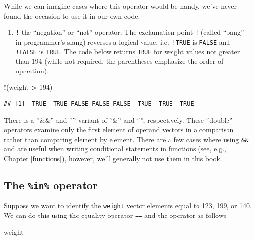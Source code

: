 \documentclass[
]{krantz}
\newenvironment{Shaded}{\begin{snugshade}}{\end{snugshade}}
\newcommand{\DecValTok}[1]{\textcolor[rgb]{0.00,0.00,0.81}{#1}}
\newcommand{\NormalTok}[1]{#1}
\newcommand{\OperatorTok}[1]{\textcolor[rgb]{0.81,0.36,0.00}{\textbf{#1}}}
\newcommand{\StringTok}[1]{\textcolor[rgb]{0.31,0.60,0.02}{#1}}
\providecommand{\tightlist}{%
  \setlength{\itemsep}{0pt}\setlength{\parskip}{0pt}}
\begin{document}
While we can imagine cases where this operator would be handy, we've never found the occasion to use it in our own code.

\begin{enumerate}
\def\labelenumi{\arabic{enumi}.}
\setcounter{enumi}{3}
\tightlist
\item
  \texttt{!} the ``negation'' or ``not'' operator: The exclamation point \texttt{!} (called ``bang'' in programmer's slang) reverses a logical value, i.e.~\texttt{!TRUE} is \texttt{FALSE} and \texttt{!FALSE} is \texttt{TRUE}. The code below returns \texttt{TRUE} for weight values not greater than 194 (while not required, the parentheses emphasize the order of operation).
\end{enumerate}

\begin{Shaded}
\begin{Highlighting}[]
\OperatorTok{!}\NormalTok{(weight }\OperatorTok{\textgreater{}}\StringTok{ }\DecValTok{194}\NormalTok{)}
\end{Highlighting}
\end{Shaded}

\begin{verbatim}
## [1]  TRUE  TRUE FALSE FALSE FALSE  TRUE  TRUE  TRUE
\end{verbatim}

There is a ``\&\&'' and ``\textbar\textbar{}'' variant of ``\&'' and ``\textbar{}'', respectively. These ``double'' operators examine only the first element of operand vectors in a comparison rather than comparing element by element. There are a few cases where using \texttt{\&\&} and \texttt{\textbar{}\textbar{}} are useful when writing conditional statements in functions (see, e.g., Chapter \ref{functions}), however, we'll generally not use them in this book.

\hypertarget{inOperator}{%
\subsection{\texorpdfstring{The \texttt{\%in\%} operator}{The \%in\% operator}}\label{inOperator}}

Suppose we want to identify the \texttt{weight} vector elements equal to 123, 199, or 140. We can do this using the equality operator \texttt{==} and the \texttt{\textbar{}} operator as follows.

\begin{Shaded}
\begin{Highlighting}[]
\NormalTok{weight}
\end{Highlighting}
\end{Shaded}
\end{document}
